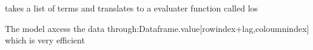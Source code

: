\documentclass[letterpaper,10pt,english]{sphinxmanual}
\begin{document}
\begin{fulllineitems}
\begin{fulllineitems}
\end{fulllineitems}


\begin{fulllineitems}
\label{\detokenize{index:modelclass.Solver_Mixin.outsolve1dcunk}}
\pysigstartsignatures
{}
\pysigstopsignatures
\sphinxAtStartPar
takes a list of terms and translates to a evaluater function called los

\sphinxAtStartPar
The model axcess the data through:Dataframe.value{[}rowindex+lag,coloumnindex{]} which is very efficient

\end{fulllineitems}



\end{fulllineitems}
\end{document}
